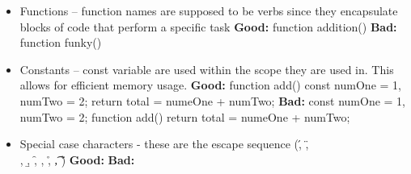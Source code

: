 \documentclass[10pt]{article}
\begin{document}
\begin{itemize}
	        \item Functions – function names are supposed to be verbs since they encapsulate blocks of code that perform a specific task
	        \newline
	        \textbf{Good:} 
	        \newline function addition()
	        \newline \textbf{Bad:} function funky()
	        \newline 
	        
	        \item Constants – const variable are used within the scope they are used in. This allows for efficient memory usage.
	        \newline
	        \textbf{Good:}
	        \newline function add(){
	        \newline const  numOne = 1, numTwo = 2;
	        \newline return total = numeOne + numTwo;
	        \newline }
	        \newline \textbf{Bad:}
	        \newline const  numOne = 1, numTwo = 2;
	        \newline function add(){
	        \newline return total = numeOne + numTwo;
	        \newline }
	        
	        \item Special case characters - these are the escape sequence (\', \", \\, \b, \f, \n, \r, \t, \v)
	        \newline
	        \textbf{Good:}
	        \newline \textbf{Bad:}
	        \newline 
	        
	    \end{itemize}
        
\end{document}
